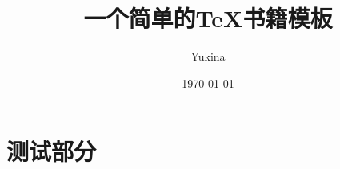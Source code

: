 \documentclass[10pt,a4paper,oneside,scheme=plain]{ctexbook}
\author{Yukina}
\title{\Huge\textbf{一个简单的\TeX 书籍模板}}
\date{\today}
\begin{document}
\frontmatter
\maketitle
\tableofcontents


\mainmatter

\part{测试部分}




\backmatter


\end{document}
